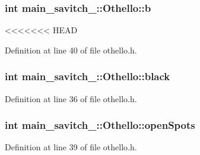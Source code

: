 \subsubsection[{\texorpdfstring{b}{b}}]{\setlength{\rightskip}{0pt plus 5cm}int main\+\_\+savitch\+\_\+::\+Othello\+::b\hspace{0.3cm}{\ttfamily [protected]}}\hypertarget{classmain__savitch__14_1_1_othello_a98fbc46241d2f5e05ccb4b66f11535bf}{}\label{classmain__savitch__14_1_1_othello_a98fbc46241d2f5e05ccb4b66f11535bf}
<<<<<<< HEAD


Definition at line 40 of file othello.\+h.

\subsubsection[{\texorpdfstring{black}{black}}]{\setlength{\rightskip}{0pt plus 5cm}int main\+\_\+savitch\+\_\+::\+Othello\+::black\hspace{0.3cm}{\ttfamily [protected]}}\hypertarget{classmain__savitch__14_1_1_othello_a2eed818925f68d5678b78107a3298138}{}\label{classmain__savitch__14_1_1_othello_a2eed818925f68d5678b78107a3298138}


Definition at line 36 of file othello.\+h.

\subsubsection[{\texorpdfstring{open\+Spots}{openSpots}}]{\setlength{\rightskip}{0pt plus 5cm}int main\+\_\+savitch\+\_\+::\+Othello\+::open\+Spots\hspace{0.3cm}{\ttfamily [protected]}}\hypertarget{classmain__savitch__14_1_1_othello_a15045e3e94c34afe08240885e230d502}{}\label{classmain__savitch__14_1_1_othello_a15045e3e94c34afe08240885e230d502}


Definition at line 39 of file othello.\+h.


